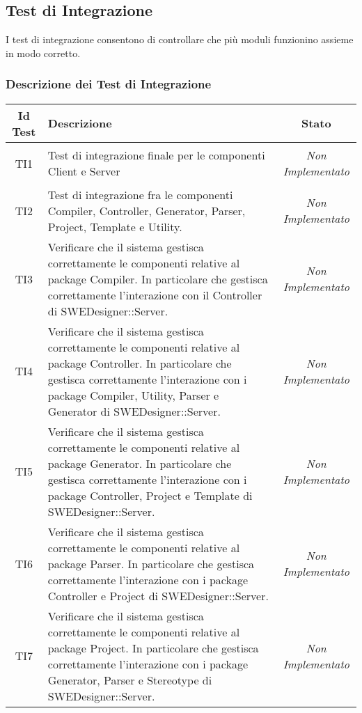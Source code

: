 	\subsection{Test di Integrazione}
	I test di integrazione consentono di controllare che più moduli funzionino assieme in modo corretto.
	
	\subsubsection{Descrizione dei Test di Integrazione}
\normalsize
\begin{longtable}{|c|>{}m{8cm}|c|}
\hline 
\textbf{Id Test} & \textbf{Descrizione} & \textbf{Stato}\\
\hline
\endhead
\hypertarget{TI1}{TI1} & Test di integrazione finale per le componenti Client e Server & \textit{Non Implementato}\\ \hline
\hypertarget{TI2}{TI2} & Test di integrazione fra le componenti Compiler, Controller, Generator, Parser, Project, Template e Utility. & \textit{Non Implementato}\\ \hline
\hypertarget{TI3}{TI3} & Verificare che il sistema gestisca correttamente le componenti relative al package Compiler. In particolare che gestisca correttamente l'interazione con il Controller di SWEDesigner::Server. & \textit{Non Implementato}\\ \hline
\hypertarget{TI4}{TI4} & Verificare che il sistema gestisca correttamente le componenti relative al package Controller. In particolare che gestisca correttamente l'interazione con i package Compiler, Utility, Parser e Generator di SWEDesigner::Server. & \textit{Non Implementato}\\ \hline
\hypertarget{TI5}{TI5} & Verificare che il sistema gestisca correttamente le componenti relative al package Generator. In particolare che gestisca correttamente l'interazione con i package Controller, Project e Template di SWEDesigner::Server. & \textit{Non Implementato}\\ \hline
\hypertarget{TI6}{TI6} & Verificare che il sistema gestisca correttamente le componenti relative al package Parser. In particolare che gestisca correttamente l'interazione con i package Controller e Project di SWEDesigner::Server. & \textit{Non Implementato}\\ \hline
\hypertarget{TI7}{TI7} & Verificare che il sistema gestisca correttamente le componenti relative al package Project. In particolare che gestisca correttamente l'interazione con i package Generator, Parser e Stereotype di SWEDesigner::Server. & \textit{Non Implementato}\\ \hline

\end{longtable}
